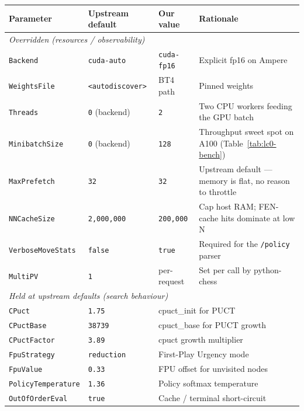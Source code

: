 \begin{table}[h]
\centering
\small
\begin{tabular}{llll}
\toprule
\textbf{Parameter} & \textbf{Upstream default} & \textbf{Our value} & \textbf{Rationale} \\
\midrule
\multicolumn{4}{l}{\emph{Overridden (resources / observability)}} \\
\midrule
\texttt{Backend}              & \texttt{cuda-auto} & \texttt{cuda-fp16} & Explicit fp16 on Ampere \\
\texttt{WeightsFile}          & \texttt{<autodiscover>} & BT4 path & Pinned weights \\
\texttt{Threads}              & \texttt{0} (backend) & \texttt{2} & Two CPU workers feeding the GPU batch \\
\texttt{MinibatchSize}        & \texttt{0} (backend) & \texttt{128} & Throughput sweet spot on A100 (Table~\ref{tab:lc0-bench}) \\
\texttt{MaxPrefetch}          & \texttt{32} & \texttt{32} & Upstream default --- memory is flat, no reason to throttle \\
\texttt{NNCacheSize}          & \texttt{2{,}000{,}000} & \texttt{200{,}000} & Cap host RAM; FEN-cache hits dominate at low N \\
\texttt{VerboseMoveStats}     & \texttt{false} & \texttt{true} & Required for the \texttt{/policy} parser \\
\texttt{MultiPV}              & \texttt{1} & per-request & Set per call by python-chess \\
\midrule
\multicolumn{4}{l}{\emph{Held at upstream defaults (search behaviour)}} \\
\midrule
\texttt{CPuct}                  & \texttt{1.75}    & \multicolumn{2}{l}{cpuct\_init for PUCT} \\
\texttt{CPuctBase}              & \texttt{38739}   & \multicolumn{2}{l}{cpuct\_base for PUCT growth} \\
\texttt{CPuctFactor}            & \texttt{3.89}    & \multicolumn{2}{l}{cpuct growth multiplier} \\
\texttt{FpuStrategy}            & \texttt{reduction}& \multicolumn{2}{l}{First-Play Urgency mode} \\
\texttt{FpuValue}               & \texttt{0.33}    & \multicolumn{2}{l}{FPU offset for unvisited nodes} \\
\texttt{PolicyTemperature}      & \texttt{1.36}    & \multicolumn{2}{l}{Policy softmax temperature} \\
\texttt{OutOfOrderEval}         & \texttt{true}    & \multicolumn{2}{l}{Cache / terminal short-circuit} \\

\end{tabular}
\end{table}
